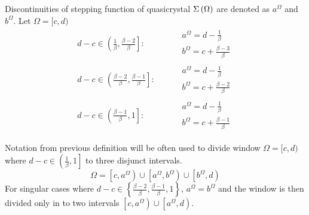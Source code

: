 \documentclass[text.tex]{subfiles}
\begin{document}
\begin{definition}
Discontinuities of stepping function of quasicrystal $\Sigma\left(\Omega\right)$ are denoted as $a^\Omega$ and $b^\Omega$. Let $\Omega = [c,d)$
\begin{align*}
d-c \in \left( \frac{1}{\beta}, \frac{\beta - 2}{\beta} \right]:& \qquad
		\begin{array}{l}
			a^\Omega = d-\frac{1}{\beta}\\[1mm]
			b^\Omega = c+\frac{\beta - 3}{\beta}
		\end{array}
\\
d-c \in \left( \frac{\beta-2}{\beta}, \frac{\beta-1}{\beta} \right]:& \qquad
		\begin{array}{l}
			a^\Omega = d-\frac{1}{\beta}\\[1mm]
			b^\Omega = c+\frac{\beta - 2}{\beta}
		\end{array}
\\
d-c \in \left( \frac{\beta-1}{\beta}, 1 \right]:& \qquad
		\begin{array}{l}
			a^\Omega = d-\frac{1}{\beta}\\[1mm]
			b^\Omega = c+\frac{\beta - 1}{\beta}
		\end{array}
\end{align*}
\end{definition}

\begin{remark}
Notation from previous definition will be often used to divide window $\Omega =  [c,d)$ where $d-c\in \left( \frac{1}{\beta}, 1\right]$ to three disjunct intervals. 
$$\Omega = \left[c,a^\Omega\right)\cup\left[a^\Omega,b^\Omega\right)\cup\left[b^\Omega,d\right)$$
For singular cases where $d-c\in \left\{ \frac{\beta-2}{\beta}, \frac{\beta-1}{\beta}, 1 \right\}$, $a^\Omega = b^\Omega$ and the window is then divided only in to two intervals $\left[c,a^\Omega\right)\cup\left[a^\Omega,d\right)$.
\end{remark}
\end{document}
